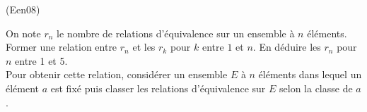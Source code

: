 \begin{tiny}(Een08)\end{tiny} 
On note $r_n$ le nombre de relations d'équivalence sur un ensemble à $n$ éléments.\newline
Former une relation entre $r_n$ et les $r_k$ pour $k$ entre $1$ et $n$.  En déduire les $r_n$ pour $n$ entre 1 et 5.\\
Pour obtenir cette relation, considérer un ensemble $E$ à $n$ éléments dans lequel un élément $a$ est fixé puis classer les relations d'équivalence sur $E$ selon la classe de $a$.